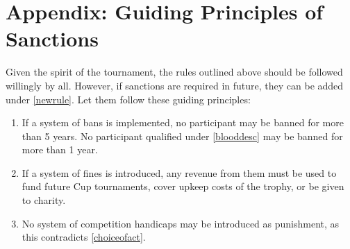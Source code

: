 \documentclass[a4paper]{article}
\begin{document}
\section*{Appendix: Guiding Principles of Sanctions}
Given the spirit of the tournament, the rules outlined above should be followed willingly by all. However, if sanctions are required in future, they can be added under \ref{newrule}. Let them follow these guiding principles:\\
\begin{enumerate}
\item If a system of bans is implemented, no participant may be banned for more than 5 years. No participant qualified under \ref{blooddesc} may be banned for more than 1 year.
\item If a system of fines is introduced, any revenue from them must be used to fund future Cup tournaments, cover upkeep costs of the trophy, or be given to charity.
\item No system of competition handicaps may be introduced as punishment, as this contradicts \ref{choiceofact}.
\end{enumerate}
\end{document}

